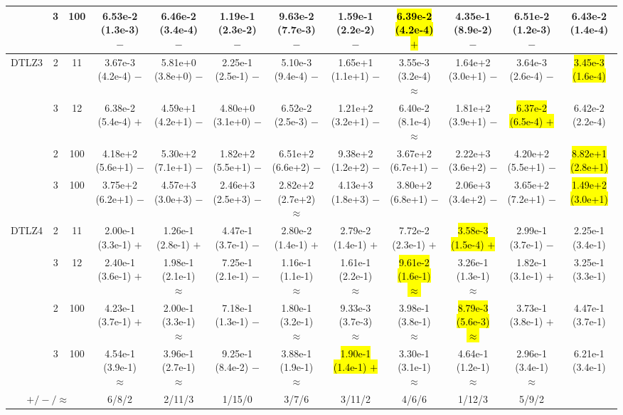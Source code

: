 \begin{table}
{\begin{tabular}{cccccccccccc}
& 3 & 100
& 6.53e-2 (1.3e-3) $-$
& 6.46e-2 (3.4e-4) $-$
& 1.19e-1 (2.3e-2) $-$
& 9.63e-2 (7.7e-3) $-$
& 1.59e-1 (2.2e-2) $-$
& \hl{6.39e-2 (4.2e-4) $+$}
& 4.35e-1 (8.9e-2) $-$
& 6.51e-2 (1.2e-3) $-$
& 6.43e-2 (1.4e-4) \\

\midrule

\multirow{4}{*}{DTLZ3}
& 2 & 11
& 3.67e-3 (4.2e-4) $-$
& 5.81e+0 (3.8e+0) $-$
& 2.25e-1 (2.5e-1) $-$
& 5.10e-3 (9.4e-4) $-$
& 1.65e+1 (1.1e+1) $-$
& 3.55e-3 (3.2e-4) $\approx$
& 1.64e+2 (3.0e+1) $-$
& 3.64e-3 (2.6e-4) $-$
& \hl{3.45e-3 (1.6e-4)} \\

& 3 & 12
& 6.38e-2 (5.4e-4) $+$
& 4.59e+1 (4.2e+1) $-$
& 4.80e+0 (3.1e+0) $-$
& 6.52e-2 (2.5e-3) $-$
& 1.21e+2 (3.2e+1) $-$
& 6.40e-2 (8.1e-4) $\approx$
& 1.81e+2 (3.9e+1) $-$
& \hl{6.37e-2 (6.5e-4) $+$}
& 6.42e-2 (2.2e-4) \\

& 2 & 100
& 4.18e+2 (5.6e+1) $-$
& 5.30e+2 (7.1e+1) $-$
& 1.82e+2 (5.5e+1) $-$
& 6.51e+2 (6.6e+2) $-$
& 9.38e+2 (1.2e+2) $-$
& 3.67e+2 (6.7e+1) $-$
& 2.22e+3 (3.6e+2) $-$
& 4.20e+2 (5.5e+1) $-$
& \hl{8.82e+1 (2.8e+1)} \\

& 3 & 100
& 3.75e+2 (6.2e+1) $-$
& 4.57e+3 (3.0e+3) $-$
& 2.46e+3 (2.5e+3) $-$
& 2.82e+2 (2.7e+2) $\approx$
& 4.13e+3 (1.8e+3) $-$
& 3.80e+2 (6.8e+1) $-$
& 2.06e+3 (3.4e+2) $-$
& 3.65e+2 (7.2e+1) $-$
& \hl{1.49e+2 (3.0e+1)} \\

\midrule

\multirow{4}{*}{DTLZ4}
& 2 & 11
& 2.00e-1 (3.3e-1) $+$
& 1.26e-1 (2.8e-1) $+$
& 4.47e-1 (3.7e-1) $-$
& 2.80e-2 (1.4e-1) $+$
& 2.79e-2 (1.4e-1) $+$
& 7.72e-2 (2.3e-1) $+$
& \hl{3.58e-3 (1.5e-4) $+$}
& 2.99e-1 (3.7e-1) $-$
& 2.25e-1 (3.4e-1) \\

& 3 & 12
& 2.40e-1 (3.6e-1) $+$
& 1.98e-1 (2.1e-1) $\approx$
& 7.25e-1 (2.1e-1) $-$
& 1.16e-1 (1.1e-1) $\approx$
& 1.61e-1 (2.2e-1) $\approx$
& \hl{9.61e-2 (1.6e-1) $\approx$}
& 3.26e-1 (1.3e-1) $\approx$
& 1.82e-1 (3.1e-1) $+$
& 3.25e-1 (3.3e-1) \\

& 2 & 100
& 4.23e-1 (3.7e-1) $+$
& 2.00e-1 (3.3e-1) $\approx$
& 7.18e-1 (1.3e-1) $-$
& 1.80e-1 (3.2e-1) $\approx$
& 9.33e-3 (3.7e-3) $\approx$
& 3.98e-1 (3.8e-1) $\approx$
& \hl{8.79e-3 (5.6e-3) $\approx$}
& 3.73e-1 (3.8e-1) $+$
& 4.47e-1 (3.7e-1) \\

& 3 & 100
& 4.54e-1 (3.9e-1) $\approx$
& 3.96e-1 (2.7e-1) $\approx$
& 9.25e-1 (8.4e-2) $-$
& 3.88e-1 (1.9e-1) $\approx$
& \hl{1.90e-1 (1.4e-1) $+$}
& 3.30e-1 (3.1e-1) $\approx$
& 4.64e-1 (1.2e-1) $\approx$
& 2.96e-1 (3.4e-1) $\approx$
& 6.21e-1 (3.4e-1) \\

\midrule
\multicolumn{3}{c}{$+/-/\approx$}
& 6/8/2 & 2/11/3 & 1/15/0 & 3/7/6 & 3/11/2 & 4/6/6 & 1/12/3 & 5/9/2 & \\
\bottomrule
\end{tabular}%
}
\end{table}